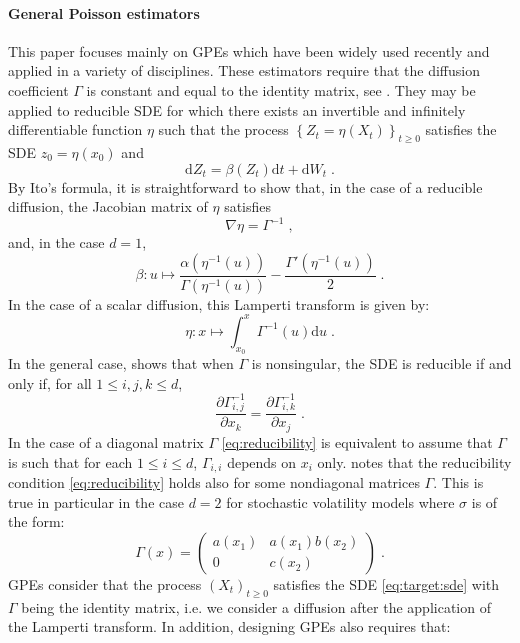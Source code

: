 \documentclass[12pt]{article}
\newcommand{\eqsp}{\;}
\newcommand{\1}{\mathrm{1}}
\begin{document}
\paragraph{General Poisson estimators}
This paper focuses mainly on GPEs which have been widely used recently and applied in a variety of disciplines. These estimators require that the diffusion coefficient $\Gamma$ is constant and equal to the identity matrix, see \cite{fearnhead:papaspiliopoulos:roberts:2008}. They may be applied to reducible SDE for which there exists an invertible and infinitely differentiable function $\eta$ such that the process $\left\{Z_t = \eta(X_t)\right\}_{t\ge 0}$ satisfies the SDE  $z_0 = \eta(x_0)$ and
\begin{equation}
\label{eq:diff:lamperti}
\mathrm{d}Z_t = \beta(Z_t)\mathrm{d}t + \mathrm{d}W_t\eqsp.
\end{equation}
By Ito's formula,  it is straightforward to show that, in the case of a reducible diffusion, the Jacobian matrix of $\eta$ satisfies
\[
\nabla \eta = \Gamma^{-1}\eqsp,
\]
and, in the case $d=1$,
\[
\beta:u \mapsto \frac{\alpha(\eta^{-1}(u))}{\Gamma(\eta^{-1}(u))} - \frac{\Gamma'(\eta^{-1}(u))}{2}\eqsp.	
\]
In the case of a scalar diffusion, this Lamperti transform is given by:
\[
\eta:x\mapsto \int_{x_0}^x\Gamma^{-1}(u)\mathrm{d}u\eqsp.
\]
In the general case, \cite[Proposition~$1$]{ait-sahalia:2008} shows that when $\Gamma$ is nonsingular, the SDE is reducible if and only if, for all $1\le i,j,k\le d$,
\begin{equation}
\label{eq:reducibility}
\frac{\partial\Gamma^{-1}_{i,j}}{\partial x_k} = \frac{\partial\Gamma^{-1}_{i,k}}{\partial x_j}\eqsp.
\end{equation}
In the case of a diagonal matrix $\Gamma$ \eqref{eq:reducibility} is equivalent to assume that $\Gamma$ is such that for each $1\le i\le d$, $\Gamma_{i,i}$ depends on $x_i$ only. \cite{ait-sahalia:2008} notes that the reducibility condition \eqref{eq:reducibility} holds also for some nondiagonal matrices $\Gamma$.
 This is true in particular in the case $d=2$ for stochastic volatility models where $\sigma$ is of the form:
\[
\Gamma(x) = \begin{pmatrix}a(x_1) & a(x_1)b(x_2)\\0&c(x_2)\end{pmatrix}\eqsp.
\]
GPEs consider that the process $(X_t)_{t\ge 0}$ satisfies the SDE \eqref{eq:target:sde} with $\Gamma$ being the identity matrix, i.e. we consider a diffusion after the application of the Lamperti transform.
 In addition, designing GPEs also requires that:
\end{document}
